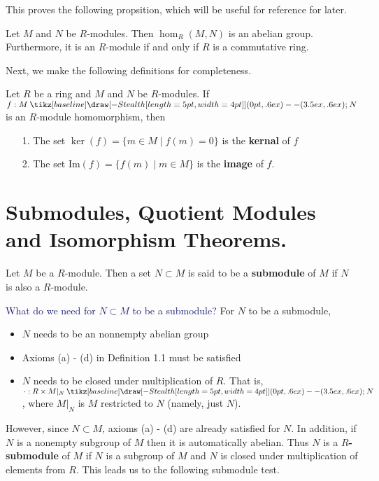 \documentclass[12pt,letterpaper]{algebra_book}
\renewcommand{\to}{\mathbin{\tikz[baseline] \draw[-{Stealth[length=5pt,width=4pt]}] (0pt,.6ex) -- (3.5ex,.6ex);}}
\newcommand{\im}{\mbox{Im}}
\theoremstyle{definition}
\begin{document}
This proves the following propsition, which will be useful for
reference for later.
\begin{proposition}\label{hom_abelian_module}
    Let $M$ and $N$ be $R$-modules. Then $\hom_R(M, N)$ is an
    abelian group. Furthermore, it is an 
    $R$-module if and only if $R$ is a commutative ring.
\end{proposition}
Next, we make the following definitions for completeness. 

\begin{definition}
    Let $R$ be a ring and $M$ and $N$ be $R$-modules. If $f: M \to
    N$ is an $R$-module homomorphism, then 
    \begin{itemize}
        \item[1.] The set $\ker(f) = \{m \in M \mid f(m) = 0\}$ is
        the \textbf{kernal} of $f$ 
        \item[2.] The set $\im(f) = \{f(m) \mid m \in M\}$ is the
        \textbf{image} of $f$.
    \end{itemize}
\end{definition}






\newpage 
\section{Submodules, Quotient Modules and Isomorphism Theorems.}

\begin{definition}
    Let $M$ be a $R$-module. Then a set $N \subset M$ is said to
    be a \textbf{submodule} of $M$ if $N$ is also a $R$-module. 
\end{definition}

\textcolor{MidnightBlue}{What do we need for $N \subset M$ to be a submodule?}
For $N$ to be a submodule,
\begin{itemize}
    \item $N$ needs to be an nonnempty abelian group 
    \item Axioms (a) - (d) in Definition 1.1 must be satisfied 
    \item $N$ needs to be closed under multiplication of $R$. That
    is, $\cdot : R \times M|_{N} \to N$, where $M|_N$ is $M$
    restricted to $N$ (namely, just $N$).
\end{itemize}

However, since $N \subset M$, axioms (a) - (d) are already
satisfied for $N$. In addition, if $N$ is a nonempty subgroup of $M$ then
it is automatically abelian. Thus $N$ is a \textbf{$R$-submodule} of $M$ if $N$
is a subgroup of $M$ and $N$ is closed under multiplication of
elements from $R$. This leads us to the following submodule test. 
\end{document}

